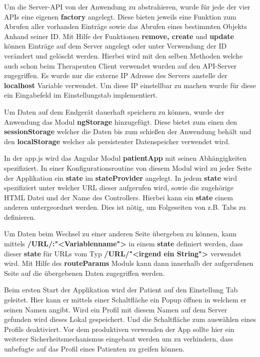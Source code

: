 Um die Server-API von der Anwendung zu abstrahieren, wurde für jede der vier APIs eine eigenen \textbf{factory} angelegt. Diese bieten jeweils eine Funktion zum Abrufen aller vorhanden Einträge sowie das Abrufen eines bestimmten Objekts Anhand seiner ID. Mit Hilfe der Funktionen \textbf{remove, create} und \textbf{update} können Einträge auf dem Server angelegt oder unter Verwendung der ID verändert und gelöscht werden. Hierbei wird mit den selben Methoden welche auch schon beim Therapeuten Client verwendet wurden auf den API-Server zugegriffen. Es wurde nur die externe IP Adresse des Servers anstelle der \textbf{localhost} Variable verwendet. Um diese IP einstellbar zu machen wurde für diese ein Eingabefeld im Einstellungstab implementiert. 

Um Daten auf dem Endgerät dauerhaft speichern zu können, wurde der Anwendung das Modul \textbf{ngStorage} hinzugefügt. Diese bietet zum einen den \textbf{sessionStorage} welcher die Daten bis zum schießen der Anwendung behält und den \textbf{localStorage} welcher als persistenter Datenspeicher verwendet wird.

In der app.js wird das Angular Modul \textbf{patientApp} mit seinen Abhängigkeiten spezifiziert. In einer Konfigurationsroutine von diesem Modul wird zu jeder Seite der Applikation ein \textbf{state} im \textbf{stateProvider} angelegt. In jedem \textbf{state} wird spezifiziert unter welcher URL dieser aufgerufen wird, sowie die zugehörige HTML Datei und der Name des Controllers. Hierbei kann ein \textbf{state} einem anderen untergeordnet werden. Dies ist nötig, um Folgeseiten von z.B. Tabs zu definieren.

Um Daten beim Wechsel zu einer anderen Seite übergeben zu können, kann mittels \textbf{/URL/:"<Variablenname">} in einem \textbf{state} definiert werden, dass dieser \textbf{state} für URLs vom Typ \textbf{/URL/"<irgend ein String">} verwendet wird. Mit Hilfe des \textbf{routeParams} Moduls kann dann innerhalb der aufgerufenen Seite auf die übergebenen Daten zugegriffen werden.

Beim ersten Start der Applikation wird der Patient auf den Einstellung Tab geleitet. Hier kann er mittels einer Schaltfläche ein Popup öffnen in welchem er seinen Namen angibt. Wird ein Profil mit diesem Namen auf dem Server gefunden wird dieses Lokal gespeichert. Und die Schaltfläche zum auswählen eines Profils deaktiviert.
Vor dem produktiven verwenden der App sollte hier ein weiterer Sicherheitsmechanismus eingebaut werden um zu verhindern, dass unbefugte auf das Profil eines Patienten zu greifen können. 
